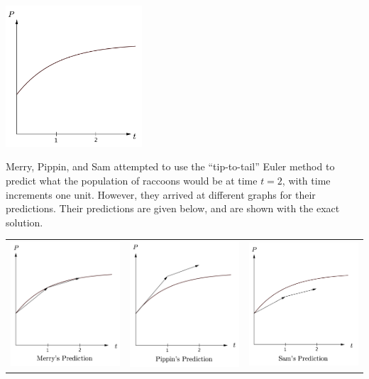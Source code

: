 \begin{enumerate}
\begin{center}
\includegraphics[width=2in]{02/02HWLotRExact.png}
\end{center}

Merry, Pippin, and Sam attempted to use the ``tip-to-tail'' Euler method to predict what the population of raccoons would be at time $t = 2$, with time increments one unit.  However, they arrived at different graphs for their predictions.  Their predictions are given below, and are shown with the exact solution.

\begin{tabular}{ccc}
\includegraphics[width=2in]{02/02HWLotRMerry.png} & \includegraphics[width=2in]{02/02HWLotRPippin.png} & \includegraphics[width=2in]{02/02HWLotRSam.png}\\
\end{tabular}


\end{enumerate}
